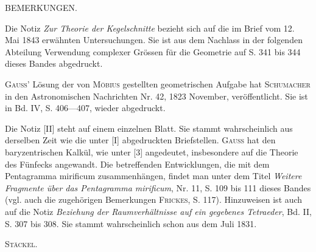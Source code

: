 \begingroup\small
\begin{center}
BEMERKUNGEN.
\end{center}

Die Notiz \emph{Zur Theorie der Kegelschnitte} bezieht sich auf die im Brief vom 12. Mai 1843 erwähnten Untersuchungen. Sie ist aus dem Nachlass in der folgenden Abteilung Verwendung complexer Grössen für die Geometrie auf S. 341 bis 344 dieses Bandes abgedruckt.

\textsc{Gauss}' Lösung der von \textsc{Möbius} gestellten geometrischen Aufgabe hat \textsc{Schumacher} in den Astronomischen Nachrichten Nr. 42, 1823 November, veröffentlicht. Sie ist in Bd. IV, S. 406---407, wieder abgedruckt.

Die Notiz [II] steht auf einem einzelnen Blatt. Sie stammt wahrscheinlich aus derselben Zeit wie die unter [I] abgedruckten Briefstellen. \textsc{Gauss} hat den baryzentrischen Kalkül, wie unter [3] angedeutet, insbesondere auf die Theorie des Fünfecks angewandt. Die betreffenden Entwicklungen, die mit dem Pentagramma mirificum zusammenhängen, findet man unter dem Titel \emph{Weitere Fragmente über das Pentagramma mirificum}, Nr. 11, S. 109 bis 111 dieses Bandes (vgl. auch die zugehörigen Bemerkungen \textsc{Frickes}, S. 117). Hinzuweisen ist auch auf die Notiz \emph{Beziehung der Raumverhältnisse auf ein gegebenes Tetraeder}, Bd. II, S. 307 bis 308. Sie stammt wahrscheinlich schon aus dem Juli 1831.

\begin{flushright}
\textsc{Stäckel}.
\end{flushright}
\par\endgroup
